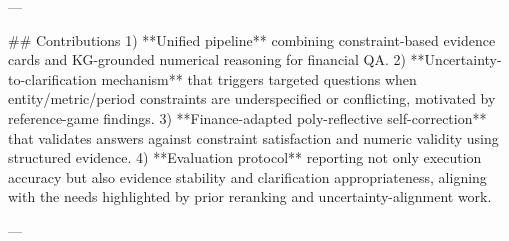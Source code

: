 ---

## Contributions  
1) **Unified pipeline** combining constraint-based evidence cards and KG-grounded numerical reasoning for financial QA.  
2) **Uncertainty-to-clarification mechanism** that triggers targeted questions when entity/metric/period constraints are underspecified or conflicting, motivated by reference-game findings.  
3) **Finance-adapted poly-reflective self-correction** that validates answers against constraint satisfaction and numeric validity using structured evidence.  
4) **Evaluation protocol** reporting not only execution accuracy but also evidence stability and clarification appropriateness, aligning with the needs highlighted by prior reranking and uncertainty-alignment work.

---